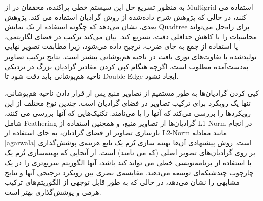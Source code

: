 به منظور تسریع حل این سیستم خطی پراکنده، محققان در \cite{fattal} از \gls{Multigrid} استفاده می کنند، در حالی که پژوهش شرح داده‌شده از روش گرادیان استفاده می کند\cite{56188}\cite{10.1145/1141911.1142005}\cite{10.1145/2070781.2024211}\cite{10.1145/2461912.2461992}. پژوهش بعدی، \cite{10.1145/1275808.1276495} نشان می‌دهد که چگونه استفاده از یک نمایش \gls{Quadtree} برای راه‌حل می‌تواند محاسبات را با کاهش حداقلی دقت، تسریع کند. \cite{fastPoisson} بیان می‌کند ترکیب در فضای لگاریتمی، یا استفاده از جمع به جای ضرب، ترجیح داده می‌شود، زیرا مطابقت تصویر نهایی تولید‌شده با تفاوت‌های نوری بافت در ناحیه هم‌پوشانی بیشتر است. نتایج ترکیب تصاویر به‌دست‌آمده مطلوب است، اگرچه هنگام کپی کردن مقادیر گرادیان بزرگ در نزدیکی ناحیه هم‌پوشانی باید دقت شود تا \gls{Double Edge} ایجاد نشود.

کپی کردن گرادیان‌ها به طور مستقیم از تصاویر منبع پس از قرار دادن ناحیه هم‌پوشانی، تنها یک رویکرد برای ترکیب تصاویر در فضای گرادیان است. \cite{SeamlessStitching} چندین نوع مختلف از این رویکردها را بررسی می‌کند که آنها را 
یا  می‌نامند. تکنیک‌هایی که آنها بررسی می کنند، شامل \gls{Feathering} گرادیان‌ها از تصاویر منبع، و همچنین استفاده از \gls{L1-Norm} در انجام بازسازی تصاویر از فضای گرادیان، به جای استفاده از \gls{L2-Norm} مانند معادله \ref{agarwala} است. روش پیشنهادی آن‌ها بهینه سازی نُرم یک تابع هزینه‌ی پوشش‌گذاری بر روی گرادیان‌های تصویر اصلی (که  می نامند) است. از آنجایی که بهینه‌سازی نُرم یک با استفاده از برنامه‌نویسی خطی می تواند کند باشد، آنها الگوریتم سریع‌تری را در یک چارچوب چندشبکه‌ای توسعه می‌دهند. مقایسه‌ی بصری بین رویکرد ترجیحی آنها و \cite{agarwala2004} نتایج مشابهی را نشان می‌دهد، در حالی که به طور قابل توجهی از الگوریتم‌های ترکیب هرمی و پوشش‌گذاری بهتر است.